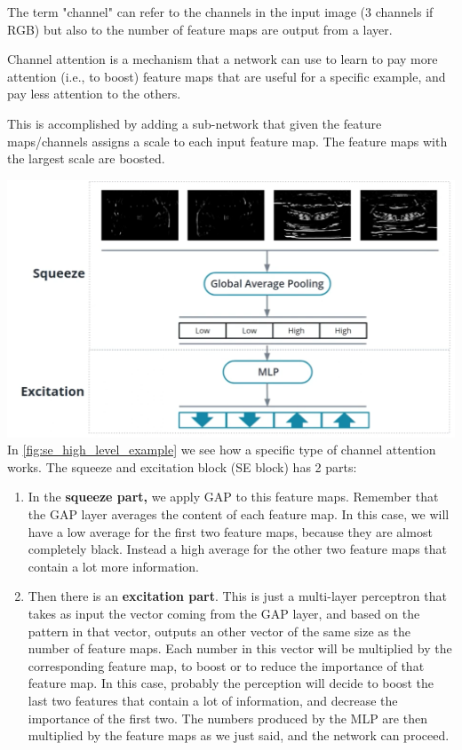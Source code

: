 The term "channel" can refer to the channels in the input image (3 channels if RGB) but also to the number of feature maps are output from a layer. \newline

Channel attention is a mechanism that a network can use to learn to pay more attention (i.e., to boost) feature maps that are useful for a specific example, and pay less attention to the others.\newline

This is accomplished by adding a sub-network that given the feature maps/channels assigns a scale to each input feature map. The feature maps with the largest scale are boosted.


\includegraphics[width=1\linewidth]{img//cnn//transfer/se_high_level_example.png}
\label{fig:se_high_level_example}
In \autoref{fig:se_high_level_example} we see how a specific type of channel attention works.
The squeeze and excitation block  (SE block) has 2 parts: 
\begin{enumerate}
    \item In the \textbf{squeeze part,} we apply GAP to this feature maps. Remember that the GAP  layer averages the content of each feature map. In this case, we will have a low average for the first two feature maps, because they are almost completely black. Instead a high average for the other two feature maps that contain a lot more information.
    \item Then there is an \textbf{excitation part}. This is just a multi-layer perceptron that takes as input the vector coming from the GAP layer, and based on the pattern in that vector, outputs an other vector of the same size as the number of feature maps. Each number in this vector will be multiplied by the corresponding feature map, to boost or to reduce the importance of that feature map. In this case, probably the perception will decide to boost the last two features that contain a lot of information, and decrease the importance of the first two. The numbers produced by the MLP are then multiplied by the feature maps as we just said, and the network can proceed.
\end{enumerate}

